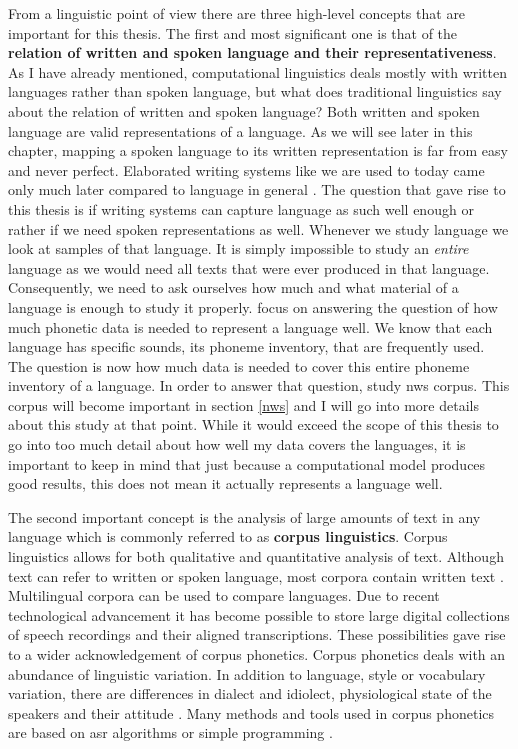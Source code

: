 \label{chap:ling-background}

From a linguistic point of view there are three high-level concepts that are important for this thesis. The first and most significant one is that of the \textbf{relation of written and spoken language and their representativeness}. As I have already mentioned, computational linguistics deals mostly with written languages rather than spoken language, but what does traditional linguistics say about the relation of written and spoken language? Both written and spoken language are valid representations of a language. As we will see later in this chapter, mapping a spoken language to its written representation is far from easy and never perfect. Elaborated writing systems like we are used to today came only much later compared to language in general \citep{writing-systems, Hock&Joseph.2019}. The question that gave rise to this thesis is if writing systems can capture language as such well enough or rather if we need spoken representations as well. Whenever we study language we look at samples of that language. It is simply impossible to study an \textit{entire} language as we would need all texts that were ever produced in that language. Consequently, we need to ask ourselves how much and what material of a language is enough to study it properly. \citet{baird_evans_greenhill_2021} focus on answering the question of how much phonetic data is needed to represent a language well. We know that each language has specific sounds, its phoneme inventory, that are frequently used. The question is now how much data is needed to cover this entire phoneme inventory of a language. In order to answer that question, \citet{baird_evans_greenhill_2021} study \ac{nws} corpus. This corpus will become important in section \ref{nws} and I will go into more details about this study at that point. While it would exceed the scope of this thesis to go into too much detail about how well my data covers the languages, it is important to keep in mind that just because a computational model produces good results, this does not mean it actually represents a language well. 

The second important concept is the analysis of large amounts of text in any language which is commonly referred to as \textbf{corpus linguistics}. Corpus linguistics allows for both qualitative and quantitative analysis of text. Although text can refer to written or spoken language, most corpora contain written text \citep{McEnery&Hardie.2011}. Multilingual corpora can be used to compare languages. Due to recent technological advancement it has become possible to store large digital collections of speech recordings and their aligned transcriptions. These possibilities gave rise to a wider acknowledgement of corpus phonetics. Corpus phonetics deals with an abundance of linguistic variation. In addition to language, style or vocabulary variation, there are differences in dialect and idiolect, physiological state of the speakers and their attitude \citep{Liberman.2019, Chodroff.19.07.2019}. Many methods and tools used in corpus phonetics are based on \ac{asr} algorithms or simple programming \citep{Chodroff.19.07.2019}.  

